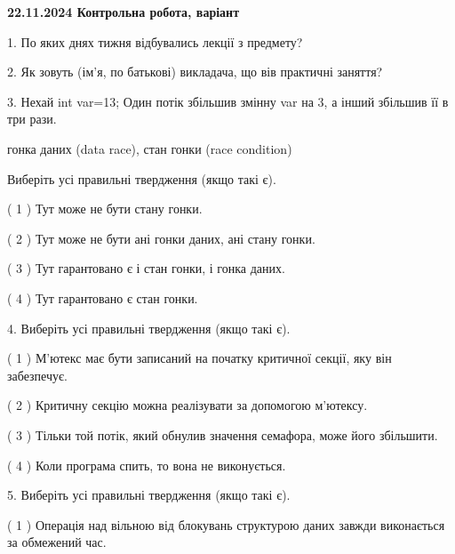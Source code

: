 \documentclass[12pt, ukrainian]{article}
\begin{document}
\vspace{4mm}
\newpage
\begin {large}

\textbf{22.11.2024 Контрольна робота, варіант  }\par


{
1. По яких днях тижня відбувались лекції з предмету?



\vspace{5mm}
2. Як зовуть (ім'я, по батькові) викладача, що вів практичні заняття?



\vspace{5mm}
3. Нехай int var=13; Один потік збільшив змінну var на 3, а інший збільшив її в три рази.

гонка даних (data race), стан гонки (race condition)

Виберіть усі правильні твердження (якщо такі є).\par
\vspace{2mm}
( 1 ) Тут може не бути стану гонки.%

( 2 ) Тут може не бути ані гонки даних, ані стану гонки.%

( 3 ) Тут гарантовано є і стан гонки, і гонка даних.%

( 4 ) Тут гарантовано є стан гонки.%


\vspace{5mm}
4. Виберіть усі правильні твердження (якщо такі є).\par
\vspace{2mm}

( 1 ) М’ютекс має бути записаний на початку критичної секції, яку він забезпечує.%

( 2 ) Критичну секцію можна реалізувати за допомогою м’ютексу.%

( 3 ) Тільки той потік, який обнулив значення семафора, може його збільшити.%

( 4 ) Коли програма спить, то вона не виконується.%


\vspace{5mm}
5. Виберіть усі правильні твердження (якщо такі є).\par
\vspace{2mm}

( 1 ) Операція над вільною від блокувань структурою даних завжди виконається за обмежений час.%

}
\end{large}
\end{document}
